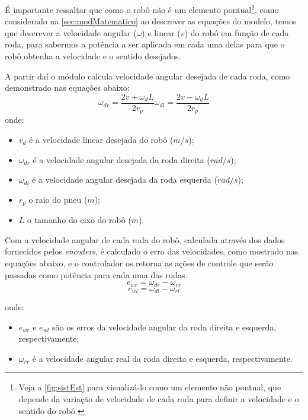 É importante ressaltar que como o robô não é um elemento pontual\footnote{Veja a \autoref{fig:sistEst} para visualizá-lo como um elemento não pontual, que depende da variação de velocidade de cada roda para definir a velocidade e o sentido do robô.}, como considerado na \autoref{sec:modMatematico} ao descrever as equações do modelo, temos que descrever a velocidade angular (\emph{$\omega$}) e linear (\emph{$v$}) do robô em função de cada roda, para sabermos a potência a ser aplicada em cada uma delas para que o robô obtenha a velocidade e o sentido desejados.

A partir daí o módulo calcula velocidade angular desejada de cada roda, como demonstrado nas equações abaixo:
\begin{subequations}
\begin{equation}
\omega_{dr} = \dfrac{2v + \omega_{d}L}{2r_{p}}	
\label{eq:velocangulardireita}
\end{equation} 
\begin{equation}
\omega_{dl} = \dfrac{2v - \omega_{d}L}{2r_{p}}	
\label{eq:velocangularesquerda}
\end{equation} 
\label{eq:convVelAngRodas}
\end{subequations}
onde:
\begin{itemize}
	\item $v_d$ é a velocidade linear desejada do robô ($m/s$);
	\item $\omega_{dr}$ é a velocidade angular desejada da roda direita ($rad/s$);
	\item $\omega_{dl}$ é a velocidade angular desejada da roda esquerda ($rad/s$);
	\item $r_{p}$ o raio do pneu ($m$);
	\item $L$ o tamanho do eixo do robô ($m$).	
\end{itemize}

Com a velocidade angular de cada roda  do robô, calculada através dos dados fornecidos pelos \emph{encoders}, é calculado o erro das velocidades, como mostrado nas equações abaixo, e o controlador os retorna as ações de controle que serão passadas como potência para cada uma das rodas.
\begin{equation}
e_{wr} = \omega_{dr} - \omega_{rr}
\label{eq:errVelAngDireita}
\end{equation} 
\begin{equation}
e_{wl} = \omega_{dl} - \omega_{rl}
\label{eq:errVelAngEsquerda}
\end{equation} 

onde:
\begin{itemize}
	\item $e_{wr}$ e $e_{wl}$ são os erros da velocidade angular da roda direita e esquerda, respectivamente;
	\item $\omega_{rr}$ é a velocidade angular real da roda direita e esquerda, respectivamente.
\end{itemize}	

